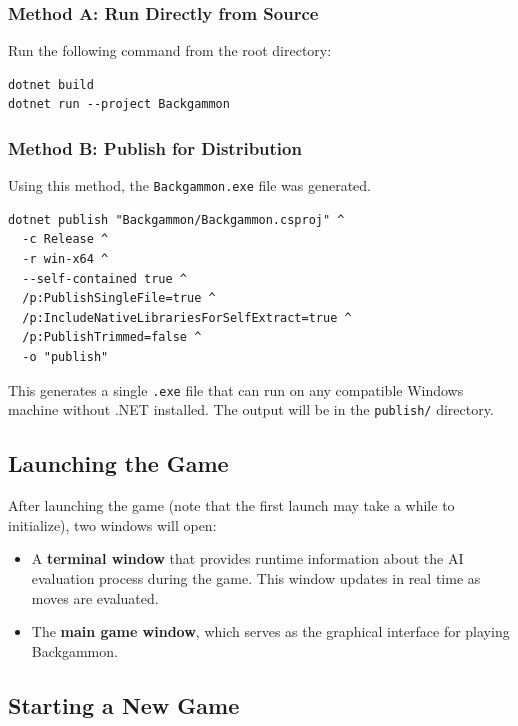 \subsubsection*{Method A: Run Directly from Source}

Run the following command from the root directory:

\begin{verbatim}
dotnet build
dotnet run --project Backgammon
\end{verbatim}


\subsubsection*{Method B: Publish for Distribution}

Using this method, the \verb|Backgammon.exe| file was generated.

\begin{verbatim}
dotnet publish "Backgammon/Backgammon.csproj" ^
  -c Release ^
  -r win-x64 ^
  --self-contained true ^
  /p:PublishSingleFile=true ^
  /p:IncludeNativeLibrariesForSelfExtract=true ^
  /p:PublishTrimmed=false ^
  -o "publish"
\end{verbatim}

This generates a single \texttt{.exe} file that can run on any compatible Windows machine without .NET installed. 
 The output will be in the \texttt{publish/} directory.

\subsection*{Launching the Game}

After launching the game (note that the first launch may take a while to initialize), two windows will open:

\begin{itemize}
    \item A \textbf{terminal window} that provides runtime information about the AI evaluation process during the game. This window updates in real time as moves are evaluated.
    \item The \textbf{main game window}, which serves as the graphical interface for playing Backgammon.
\end{itemize}

\subsection*{Starting a New Game}


